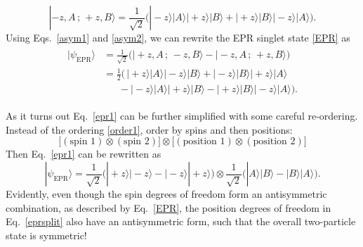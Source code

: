 \documentclass[pra,12pt]{revtex4}
\begin{document}
\begin{equation}
  |-\!z, A\,;\, +z, B\rangle = \frac{1}{\sqrt{2}}
  \Big(|\!-\!z\rangle|A\rangle |\!+\!z\rangle|B\rangle
  + |\!+\!z\rangle|B\rangle |\!-\!z\rangle|A\rangle \Big).
  \label{asym2}
\end{equation}
Using Eqs.~\eqref{asym1} and \eqref{asym2}, we can rewrite the EPR
singlet state \eqref{EPR} as
\begin{align}
  \begin{aligned}
    |\psi_{\mathrm{EPR}}\rangle &= \frac{1}{\sqrt{2}} \Big(
    |\!+\!z, A\,;\, -z, B\rangle - |-\!z, A\,;\, +z, B\rangle \Big)\\
    &= \frac{1}{2} \Big(\,
    |\!+\!z\rangle|A\rangle |\!-\!z\rangle|B\rangle
    + |\!-\!z\rangle|B\rangle |\!+\!z\rangle|A\rangle \\
    &\quad\;\;- |\!-\!z\rangle|A\rangle |\!+\!z\rangle|B\rangle
    - |\!+\!z\rangle|B\rangle |\!-\!z\rangle|A\rangle \Big).
    \label{epr1}
  \end{aligned}
\end{align}

As it turns out Eq.~\eqref{epr1} can be further simplified with some
careful re-ordering.  Instead of the ordering \eqref{order1}, order by
spins and then positions:
\begin{equation}
  \Big[
    (\textrm{spin 1}) \otimes (\textrm{spin 2}) \Big]
  \otimes
  \Big[
    (\textrm{position 1}) \otimes (\textrm{position 2}) \Big]
  \label{order2}
\end{equation}
Then Eq.~\eqref{epr1} can be rewritten as
\begin{equation}
  |\psi_{\mathrm{EPR}}\rangle = \frac{1}{\sqrt{2}} \Big(
  |\!+\!z\rangle |\!-\!z\rangle - |\!-\!z\rangle |\!+\!z\rangle \Big)  
  \otimes \frac{1}{\sqrt{2}} \Big(
  |A\rangle |B\rangle - |B\rangle |A\rangle \Big).
  \label{eprsplit}
\end{equation}
Evidently, even though the spin degrees of freedom form an
antisymmetric combination, as described by Eq.~\eqref{EPR}, the
position degrees of freedom in Eq.~\eqref{eprsplit} also have an
antisymmetric form, such that the overall two-particle state is
symmetric!
\end{document}
